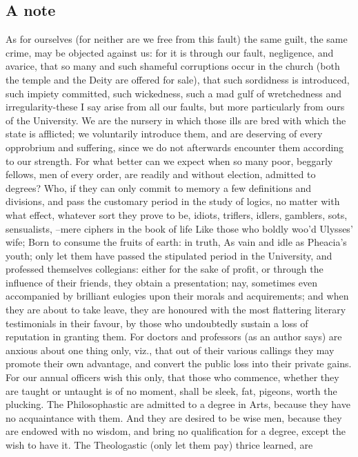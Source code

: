 {\subsection{A note}
{
As for ourselves (for neither are we free from this fault) the same guilt, the
same crime, may be objected against us: for it is through our fault,
negligence, and avarice, that so many and such shameful corruptions occur in
the church (both the temple and the Deity are offered for sale), that such
sordidness is introduced, such impiety committed, such wickedness, such a mad
gulf of wretchedness and irregularity-these I say arise from all our faults,
but more particularly from ours of the University. We are the nursery in which
those ills are bred with which the state is afflicted; we voluntarily introduce
them, and are deserving of every opprobrium and suffering, since we do not
afterwards encounter them according to our strength. For what better can we
expect when so many poor, beggarly fellows, men of every order, are readily and
without election, admitted to degrees? Who, if they can only commit to memory a
few definitions and divisions, and pass the customary period in the study of
logics, no matter with what effect, whatever sort they prove to be, idiots,
triflers, idlers, gamblers, sots, sensualists, --mere ciphers in the book of
life Like those who boldly woo'd Ulysses' wife; Born to consume the fruits of
earth: in truth, As vain and idle as Pheacia's youth; only let them have passed
the stipulated period in the University, and professed themselves collegians:
either for the sake of profit, or through the influence of their friends, they
obtain a presentation; nay, sometimes even accompanied by brilliant eulogies
upon their morals and acquirements; and when they are about to take leave, they
are honoured with the most flattering literary testimonials in their favour, by
those who undoubtedly sustain a loss of reputation in granting them. For
doctors and professors (as an author says) are anxious about one thing only,
viz., that out of their various callings they may promote their own advantage,
and convert the public loss into their private gains. For our annual officers
wish this only, that those who commence, whether they are taught or untaught is
of no moment, shall be sleek, fat, pigeons, worth the plucking. The
Philosophastic are admitted to a degree in Arts, because they have no
acquaintance with them. And they are desired to be wise men, because they are
endowed with no wisdom, and bring no qualification for a degree, except the
wish to have it. The Theologastic (only let them pay) thrice learned, are
}}
